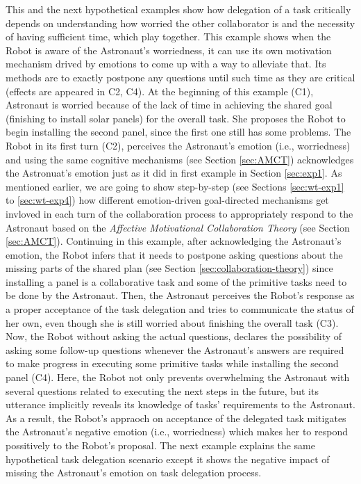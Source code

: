 This and the next hypothetical examples show how delegation of a task critically
depends on understanding how worried the other collaborator is and the necessity
of having sufficient time, which play together. This example shows when the
Robot is aware of the Astronaut's worriedness, it can use its own motivation
mechanism drived by emotions to come up with a way to alleviate that. Its
methods are to exactly postpone any questions until such time as they are
critical (effects are appeared in C2, C4). At the beginning of this example
(C1), Astronaut is worried because of the lack of time in achieving the shared
goal (finishing to install solar panels) for the overall task. She proposes the
Robot to begin installing the second panel, since the first one still has some
problems. The Robot in its first turn (C2), perceives the Astronaut's emotion
(i.e., worriedness) and using the same cognitive mechanisms (see Section
\ref{sec:AMCT}) acknowledges the Astronuat's emotion just as it did in first
example in Section \ref{sec:exp1}. As mentioned earlier, we are going to show
step-by-step (see Sections \ref{sec:wt-exp1} to \ref{sec:wt-exp4}) how different
emotion-driven goal-directed mechanisms get invloved in each turn of the
collaboration process to appropriately respond to the Astronaut based on the
\textit{Affective Motivational Collaboration Theory} (see Section
\ref{sec:AMCT}). Continuing in this example, after acknowledging the Astronaut's
emotion, the Robot infers that it needs to postpone asking questions about the
missing parts of the shared plan (see Section \ref{sec:collaboration-theory})
since installing a panel is a collaborative task and some of the primitive tasks
need to be done by the Astronaut. Then, the Astronaut perceives the Robot's
response as a proper acceptance of the task delegation and tries to communicate
the status of her own, even though she is still worried about finishing the
overall task (C3). Now, the Robot without asking the actual questions, declares
the possibility of asking some follow-up questions whenever the Astronaut's
answers are required to make progress in executing some primitive tasks
while installing the second panel (C4). Here, the Robot not only prevents
overwhelming the Astronaut with several questions related to executing the next
steps in the future, but its utterance implicitly reveals its knowledge of
tasks' requirements to the Astronaut. As a result, the Robot's appraoch on
acceptance of the delegated task mitigates the Astronaut's negative emotion
(i.e., worriedness) which makes her to respond possitively to the Robot's
proposal. The next example explains the same hypothetical task delegation
scenario except it shows the negative impact of missing the Astronaut's emotion
on task delegation process.\\

